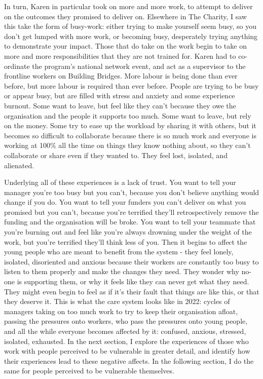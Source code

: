 In turn, Karen in particular took on more and more work, to attempt to deliver on the outcomes they promised to deliver on. Elsewhere in The Charity, I saw this take the form of busy-work: either trying to make yourself seem busy, so you don’t get lumped with more work, or becoming busy, desperately trying anything to demonstrate your impact. Those that do take on the work begin to take on more and more responsibilities that they are not trained for. Karen had to co-ordinate the program’s national network event, and act as a supervisor to the frontline workers on Building Bridges. More labour is being done than ever before, but more labour is required than ever before. People are trying to be busy or appear busy, but are filled with stress and anxiety and some experience burnout. Some want to leave, but feel like they can’t because they owe the organisation and the people it supports too much. Some want to leave, but rely on the money. Some try to ease up the workload by sharing it with others, but it becomes so difficult to collaborate because there is so much work and everyone is working at 100\% all the time on things they know nothing about, so they can’t collaborate or share even if they wanted to. They feel lost, isolated, and alienated.

Underlying all of these experiences is a lack of trust. You want to tell your manager you’re too busy but you can’t, because you don’t believe anything would change if you do. You want to tell your funders you can’t deliver on what you promised but you can’t, because you’re terrified they’ll retrospectively remove the funding and the organisation will be broke. You want to tell your teammate that you’re burning out and feel like you’re always drowning under the weight of the work, but you’re terrified they’ll think less of you. Then it begins to affect the young people who are meant to benefit from the system - they feel lonely, isolated, disoriented and anxious because their workers are constantly too busy to listen to them properly and make the changes they need. They wonder why no-one is supporting them, or why it feels like they can never get what they need. They might even begin to feel as if it’s their fault that things are like this, or that they deserve it. This is what the care system looks like in 2022: cycles of managers taking on too much work to try to keep their organisation afloat, passing the pressures onto workers, who pass the pressures onto young people, and all the while everyone becomes affected by it: confused, anxious, stressed, isolated, exhausted. In the next section, I explore the experiences of those who work with people perceived to be vulnerable in greater detail, and identify how their experiences lead to these negative affects. In the following section, I do the same for  people perceived to be vulnerable themselves. 

